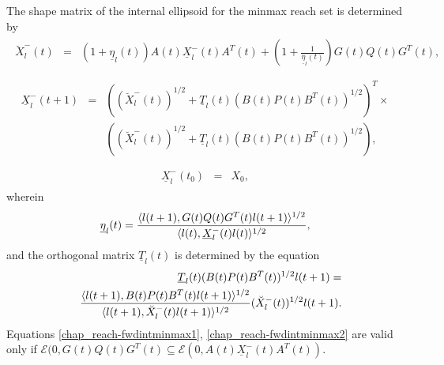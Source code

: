 \documentclass[letterpaper,10pt,english]{sphinxmanual}
\begin{document}
The shape matrix of the internal ellipsoid for the minmax reach set is
determined by
\label{chap_reach:equation-fwdintminmax1}\begin{gather}
\begin{split}\breve{X}^-_l(t) & = & (1+\underline{\eta}_l(t))A(t)\underline{X}^-_l(t)A^T(t) +
\left(1+\frac{1}{\underline{\eta}_l(t)}\right)
G(t)Q(t)G^T(t),\\\end{split}\label{chap_reach-fwdintminmax1}
\end{gather}\label{chap_reach:equation-fwdintminmax2}\begin{gather}
\begin{split}\underline{X}^-_l(t+1) & = & \left((\breve{X}^-_l(t))^{1/2} +
\underline{T}_l(t)(B(t)P(t)B^T(t))^{1/2}\right)^T
\times \nonumber \\
& &\left((\breve{X}^-_l(t))^{1/2} + \underline{T}_l(t)(B(t)P(t)B^T(t))^{1/2}\right),\\\end{split}\label{chap_reach-fwdintminmax2}
\end{gather}\label{chap_reach:equation-fwdintminmax3}\begin{gather}
\begin{split}\underline{X}^-_l(t_0) & = & X_0,\end{split}\label{chap_reach-fwdintminmax3}
\end{gather}
wherein
\begin{gather}
\begin{split}\underline{\eta}_l(t) = \frac{\langle l(t+1),
G(t)Q(t)G^T(t)l(t+1)\rangle^{1/2}}{\langle l(t),
\underline{X}^-_l(t)l(t)\rangle^{1/2}},\end{split}\notag
\end{gather}
and the orthogonal matrix $\underline{T}_l(t)$ is determined by
the equation
\begin{gather}
\begin{split}\begin{aligned}
& & \underline{T}_l(t)(B(t)P(t)B^T(t))^{1/2}l(t+1) = \\
& & \frac{\langle l(t+1),
B(t)P(t)B^T(t)l(t+1)\rangle^{1/2}}{\langle l(t+1),
\breve{X}^-_l(t)l(t+1)\rangle^{1/2}}(\breve{X}^-_l(t))^{1/2}l(t+1).\end{aligned}\end{split}\notag
\end{gather}
Equations \eqref{chap_reach-fwdintminmax1}, \eqref{chap_reach-fwdintminmax2} are valid only if
${\mathcal E}(0,G(t)Q(t)G^T(t)\subseteq{\mathcal E}(0,A(t)\underline{X}^-_l(t)A^T(t))$.
\end{document}
